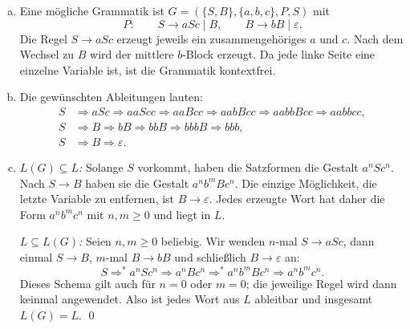 \begin{loesung}
\begin{enumerate}[a)]
\item Eine mögliche Grammatik ist $G=(\{S,B\},\{a,b,c\},P,S)$ mit
\[
P:\qquad S\to aSc\mid B,\qquad B\to bB\mid\varepsilon.
\]
Die Regel $S\to aSc$ erzeugt jeweils ein zusammengehöriges $a$ und $c$.
Nach dem Wechsel zu $B$ wird der mittlere $b$-Block erzeugt.
Da jede linke Seite eine einzelne Variable ist, ist die Grammatik kontextfrei.

\item Die gewünschten Ableitungen lauten:
\begin{align*}
S&\Rightarrow aSc\Rightarrow aaScc\Rightarrow aaBcc
  \Rightarrow aabBcc\Rightarrow aabbBcc\Rightarrow aabbcc,\\
S&\Rightarrow B\Rightarrow bB\Rightarrow bbB\Rightarrow bbbB
  \Rightarrow bbb,\\
S&\Rightarrow B\Rightarrow\varepsilon.
\end{align*}

\item \emph{$L(G)\subseteq L$:} Solange $S$ vorkommt, haben die Satzformen
 die Gestalt $a^nSc^n$. Nach $S\to B$ haben sie die Gestalt $a^nb^mBc^n$.
Die einzige Möglichkeit, die letzte Variable zu entfernen, ist $B\to\varepsilon$.
Jedes erzeugte Wort hat daher die Form $a^nb^mc^n$ mit $n,m\geq0$ und liegt in $L$.

\emph{$L\subseteq L(G)$:} Seien $n,m\geq0$ beliebig.
Wir wenden $n$-mal $S\to aSc$, dann einmal $S\to B$,
$m$-mal $B\to bB$ und schließlich $B\to\varepsilon$ an:
\[
S\Rightarrow^* a^nSc^n\Rightarrow a^nBc^n
 \Rightarrow^* a^nb^mBc^n\Rightarrow a^nb^mc^n.
\]
Dieses Schema gilt auch für $n=0$ oder $m=0$; die jeweilige Regel wird dann
keinmal angewendet. Also ist jedes Wort aus $L$ ableitbar und insgesamt $L(G)=L$. \qed
\end{enumerate}
\end{loesung}



